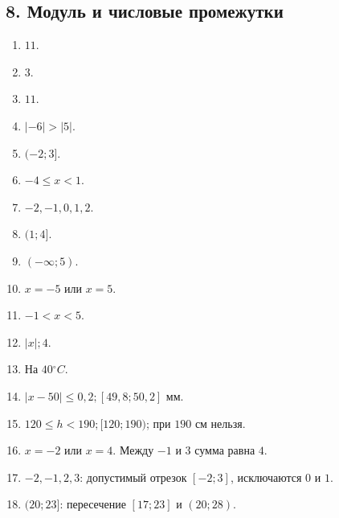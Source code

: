 \documentclass[12pt,a4paper]{article}
\theoremstyle{definition}
\theoremstyle{plain}
\theoremstyle{remark}
\newcommand{\starmark}{\ensuremath{{}^{\ast}}}
\begin{document}
\subsection*{8. Модуль и числовые промежутки}
\begin{enumerate}[label=8.\arabic*.,leftmargin=2.8em,itemsep=5pt]
\item \(11\).
\item \(3\).
\item \(11\).
\item \(| - 6 | > | 5 |\).
\item \((- 2;\allowbreak 3]\).
\item \(- 4 \le  x < 1\).
\item \(- 2,\allowbreak - 1,\allowbreak 0,\allowbreak 1,\allowbreak 2\).
\item \((1;\allowbreak 4]\).
\item \((- \infty ;\allowbreak 5)\).
\item \(x = - 5\) или \(x = 5\).
\item \(- 1 < x < 5\).
\item \(| x |;\allowbreak 4\).
\item На \(40 {}^{\circ} C\).
\item \(| x - 50 | \le  0{,}2;\allowbreak [49{,}8;\allowbreak 50{,}2]\) мм.
\item \(120 \le  h < 190;\allowbreak [120;\allowbreak 190)\); при \(190\) см нельзя.
\item[\textbf{8.16.}\starmark] \(x = - 2\) или \(x = 4\). Между \(- 1\) и \(3\) сумма равна \(4\).
\item[\textbf{8.17.}\starmark] \(- 2,\allowbreak - 1,\allowbreak 2,\allowbreak 3\): допустимый отрезок \([- 2;\allowbreak 3]\), исключаются \(0\) и \(1\).
\item[\textbf{8.18.}\starmark] \((20;\allowbreak 23]\): пересечение \([17;\allowbreak 23]\) и \((20;\allowbreak 28)\).
\end{enumerate}
\end{document}
